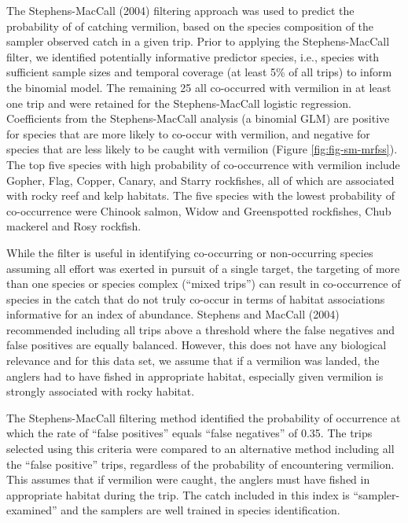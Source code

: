 \documentclass[11pt,
  english,
  a4paper,
]{article}
\begin{document}
The Stephens-MacCall {(2004)\leavevmode\tagmcend\tagstructend} filtering approach was used to predict the probability of of catching vermilion, based on the species composition of the sampler observed catch in a given trip. Prior to applying the Stephens-MacCall filter, we identified potentially informative predictor species, i.e., species with sufficient sample sizes and temporal coverage (at least 5\% of all trips) to inform the binomial model. The remaining 25 all co-occurred with vermilion in at least one trip and were retained for the Stephens-MacCall logistic regression. Coefficients from the Stephens-MacCall analysis (a binomial GLM) are positive for species that are more likely to co-occur with vermilion, and negative for species that are less likely to be caught with vermilion (Figure \ref{fig:fig-sm-mrfss}). The top five species with high probability of co-occurrence with vermilion include Gopher, Flag, Copper, Canary, and Starry rockfishes, all of which are associated with rocky reef and kelp habitats. The five species with the lowest probability of co-occurrence were Chinook salmon, Widow and Greenspotted rockfishes, Chub mackerel and Rosy rockfish.

While the filter is useful in identifying co-occurring or non-occurring species assuming all effort was exerted in pursuit of a single target, the targeting of more than one species or species complex (``mixed trips'') can result in co-occurrence of species in the catch that do not truly co-occur in terms of habitat associations informative for an index of abundance. Stephens and MacCall {(2004)\leavevmode\tagmcend\tagstructend} recommended including all trips above a threshold where the false negatives and false positives are equally balanced. However, this does not have any biological relevance and for this data set, we assume that if a vermilion was landed, the anglers had to have fished in appropriate habitat, especially given vermilion is strongly associated with rocky habitat.

The Stephens-MacCall filtering method identified the probability of occurrence at which the rate of ``false positives'' equals ``false negatives'' of 0.35. The trips selected using this criteria were compared to an alternative method including all the ``false positive'' trips, regardless of the probability of encountering vermilion. This assumes that if vermilion were caught, the anglers must have fished in appropriate habitat during the trip. The catch included in this index is ``sampler-examined'' and the samplers are well trained in species identification.
\end{document}
